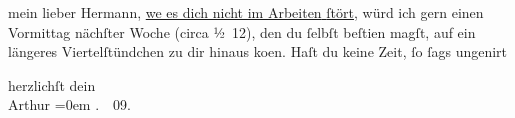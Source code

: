 \pstart
           mein lieber Hermann,{ }\uline{we\damage{{\geminationn}} es dich nicht im Arbeiten{ }ſtört}, würd ich gern einen Vormittag
               nächſter Woche (circa ½ 12), den du{ }ſelbſt beſti{\geminationm}en
               magſt, auf ein längeres Viertelſtündchen zu dir hinaus ko{\geminationm}en. {\pb}Haſt du keine
               Zeit,{ }ſo{ }ſags ungenirt\pend
           
\pstart
           herzlichſt dein{\\[\baselineskip]}\spacefill\mbox{Arthur}\pend
           \leftskip=0em{}
. \label{T_L01823-1v}\label{T_L01823-1} 09.\pend
           \endnumbering{}  \newcommand{\dateiname}{L01823}\newcommand{\titel}{Arthur Schnitzler an Hermann Bahr, 16. [1.] 1909}\newcommand{\editorInnen}{Herausgegeben von Martin Anton Müller}
